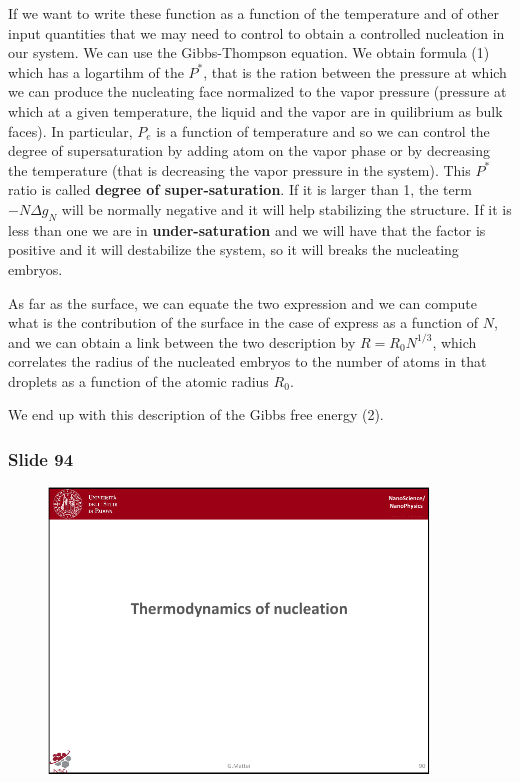 \documentclass[../main/main.tex]{subfiles}
\begin{document}
If we want to write these function as a function of the temperature and of other input quantities that we may need to control to obtain a controlled nucleation in our system. We can use the Gibbs-Thompson equation. We obtain formula (1) which has a logartihm of the \( P^* \), that is the ration between the pressure at which we can produce the nucleating face normalized to the vapor pressure (pressure at which at a given temperature, the liquid and the vapor are in quilibrium as bulk faces). In particular, \( P_e \) is a function of temperature and so we can control the degree of supersaturation by adding atom on the vapor phase or by decreasing the temperature (that is decreasing the vapor pressure in the system). This \( P^* \) ratio is called \textbf{degree of super-saturation}. If it is larger than 1, the term \( -N \Delta g_N \) will be normally negative and it will help stabilizing the structure. If it is less than one we are in \textbf{under-saturation} and we will have that the factor is positive and it will destabilize the system, so it will breaks the nucleating embryos.

As far as the surface, we can equate the two expression and we can compute what is the contribution of the surface in the case of express as a function of \( N \), and we can obtain a link between the two description by \( R=R_0N^{1/3} \), which correlates the radius of the nucleated embryos to the number of atoms in that droplets as a function of the atomic radius \( R_0 \).

We end up with this description of the Gibbs free energy (2).

\newpage
\subsubsection{Slide 94}

\begin{figure}[h!]
\centering
\includegraphics[page=5,width=0.9\textwidth]{../lessons/pdf_file/6_lesson.pdf}
\end{figure}
\end{document}
